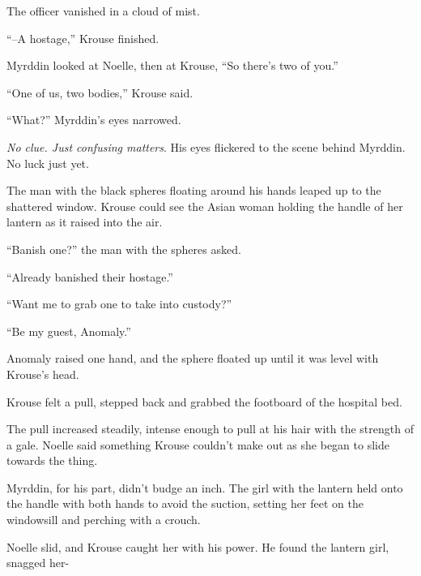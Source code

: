 The officer vanished in a cloud of mist.



``--A hostage,'' Krouse finished.



Myrddin looked at Noelle, then at Krouse, ``So there's two of you.''



``One of us, two bodies,'' Krouse said.



``What?''  Myrddin's eyes narrowed.



\emph{No clue.  Just confusing matters}.  His eyes flickered to the scene behind Myrddin.  No luck just yet.



The man with the black spheres floating around his hands leaped up to the shattered window.  Krouse could see the Asian woman holding the handle of her lantern as it raised into the air.



``Banish one?'' the man with the spheres asked.



``Already banished their hostage.''



``Want me to grab one to take into custody?''



``Be my guest, Anomaly.''



Anomaly raised one hand, and the sphere floated up until it was level with Krouse's head.



Krouse felt a pull, stepped back and grabbed the footboard of the hospital bed.



The pull increased steadily, intense enough to pull at his hair with the strength of a gale.  Noelle said something Krouse couldn't make out as she began to slide towards the thing.



Myrddin, for his part, didn't budge an inch.  The girl with the lantern held onto the handle with both hands to avoid the suction, setting her feet on the windowsill and perching with a crouch.



Noelle slid, and Krouse caught her with his power.  He found the lantern girl, snagged her-



